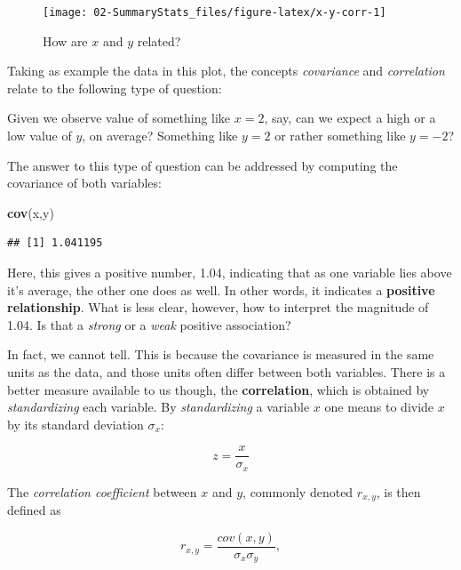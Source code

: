 \documentclass[]{book}
\newenvironment{Shaded}{\begin{snugshade}}{\end{snugshade}}
\newcommand{\KeywordTok}[1]{\textcolor[rgb]{0.13,0.29,0.53}{\textbf{#1}}}
\newcommand{\NormalTok}[1]{#1}
\newenvironment{note}{\begin{tcolorbox}[colback=blue!5!white,colframe=blue!75!black]}{\end{tcolorbox}}
\begin{document}
\begin{figure}

{\centering \texttt{[image: 02-SummaryStats\_files/figure-latex/x-y-corr-1]} 

}

\caption{How are $x$ and $y$ related?}\label{fig:x-y-corr}
\end{figure}

Taking as example the data in this plot, the concepts \emph{covariance}
and \emph{correlation} relate to the following type of question:

\begin{note}
Given we observe value of something like \(x=2\), say, can we expect a
high or a low value of \(y\), on average? Something like \(y=2\) or
rather something like \(y=-2\)?
\end{note}

 The answer to this type of question can be addressed by computing the
covariance of both variables:

\begin{Shaded}
\begin{Highlighting}[]
\KeywordTok{cov}\NormalTok{(x,y)  }
\end{Highlighting}
\end{Shaded}

\begin{verbatim}
## [1] 1.041195
\end{verbatim}

Here, this gives a positive number, 1.04, indicating that as one
variable lies above it's average, the other one does as well. In other
words, it indicates a \textbf{positive relationship}. What is less
clear, however, how to interpret the magnitude of 1.04. Is that a
\emph{strong} or a \emph{weak} positive association?

In fact, we cannot tell. This is because the covariance is measured in
the same units as the data, and those units often differ between both
variables. There is a better measure available to us though, the
\textbf{correlation}, which is obtained by \emph{standardizing} each
variable. By \emph{standardizing} a variable \(x\) one means to divide
\(x\) by its standard deviation \(\sigma_x\):

\[
z = \frac{x}{\sigma_x}
\]

The \emph{correlation coefficient} between \(x\) and \(y\), commonly
denoted \(r_{x,y}\), is then defined as

\[
r_{x,y} = \frac{cov(x,y)}{\sigma_x \sigma_y},
\]
\end{document}
